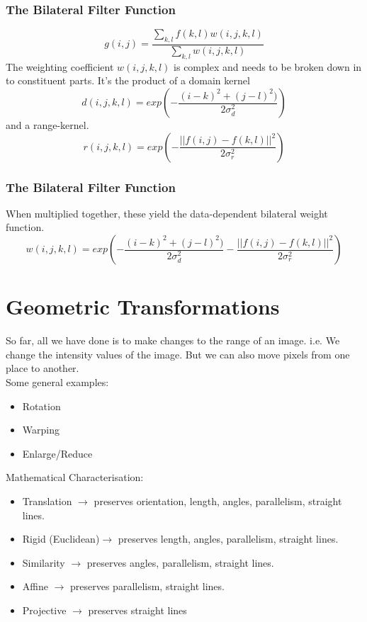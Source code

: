 \begin{frame}\frametitle{The Bilateral Filter Function}

\begin{equation}
    g(i,j) = \frac{\sum_{k,l}f(k,l)w(i,j,k,l)}{\sum_{k,l}w(i,j,k,l)}
\end{equation}
The weighting coefficient $w(i,j,k,l)$ is complex and needs to be broken down in to constituent parts. It's the product of a domain kernel
\begin{equation}
    d(i,j,k,l)=exp\left(-\frac{(i-k)^2+(j-l)^2)}{2\sigma^2_d}\right)
\end{equation}
and a range-kernel.
\begin{equation}
    r(i,j,k,l)=exp\left(-\frac{||f(i,j)-f(k,l)||^2}{2\sigma^2_r}\right)
\end{equation}
\end{frame}

\begin{frame}\frametitle{The Bilateral Filter Function}
When multiplied together, these yield the data-dependent bilateral weight function.
\begin{equation}
    w(i,j,k,l)=exp\left(-\frac{(i-k)^2+(j-l)^2)}{2\sigma^2_d}-\frac{||f(i,j)-f(k,l)||^2}{2\sigma^2_r}\right)
\end{equation}
\end{frame}


\iffalse
\section{Geometric Transformations}
So far, all we have done is to make changes to the range of an image. i.e. We change the intensity values of the image. But we can also move pixels from one place to another.\\
Some general examples:
\begin{itemize}
	\item Rotation
	\item Warping
	\item Enlarge/Reduce
\end{itemize}
Mathematical Characterisation:
\begin{itemize}
    \item Translation $\to$ preserves orientation, length, angles, parallelism, straight lines.
	\item Rigid (Euclidean)$\to$ preserves length, angles, parallelism, straight lines.
	\item Similarity $\to$ preserves angles, parallelism, straight lines.
	\item Affine $\to$ preserves parallelism, straight lines.
	\item Projective $\to$ preserves straight lines
\end{itemize}

